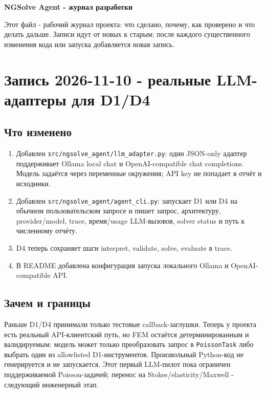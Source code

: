 \documentclass[11pt,a4paper]{article}
\begin{document}
\begin{center}
    {\LARGE\bfseries NGSolve Agent - журнал разработки}
\end{center}

\vspace{1em}

Этот файл - рабочий журнал проекта: что сделано, почему, как проверено и что делать дальше. Записи идут от новых к старым; после каждого существенного изменения кода или запуска добавляется новая запись.

\section{Запись 2026-11-10 - реальные LLM-адаптеры для D1/D4}

\subsection{Что изменено}

\begin{enumerate}
    \item Добавлен \texttt{src/ngsolve\_agent/llm\_adapter.py}: один JSON-only адаптер поддерживает Ollama local chat и OpenAI-compatible chat completions. Модель задаётся через переменные окружения; API key не попадает в отчёт и исходники.
    \item Добавлен \texttt{src/ngsolve\_agent/agent\_cli.py}: запускает D1 или D4 на обычном пользовательском запросе и пишет запрос, архитектуру, provider/model, trace, время/usage LLM-вызовов, solver status и путь к численному отчёту.
    \item D4 теперь сохраняет шаги interpret, validate, solve, evaluate в trace.
    \item В README добавлена конфигурация запуска локального Ollama и OpenAI-compatible API.
\end{enumerate}

\subsection{Зачем и границы}

Раньше D1/D4 принимали только тестовые callback-заглушки. Теперь у проекта есть реальный API-клиентский путь, но FEM остаётся детерминированным и валидируемым: модель может только преобразовать запрос в \texttt{PoissonTask} либо выбрать один из allowlisted D1-инструментов. Произвольный Python-код не генерируется и не запускается. Этот первый LLM-пилот пока ограничен поддерживаемой Poisson-задачей; перенос на Stokes/elasticity/Maxwell - следующий инженерный этап.
\end{document}

